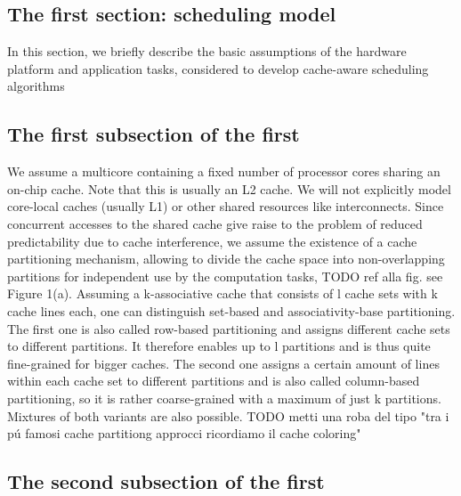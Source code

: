 \documentclass[a4paper,10pt]{article}
\begin{document}
\begin{multicols}{2}
\section{The first section: scheduling model}

In this section, we briefly describe the basic assumptions of the hardware platform and application tasks, considered to develop cache-aware 
scheduling algorithms

\subsection{The first subsection of the first}

We assume a multicore containing a fixed number of processor cores sharing an on-chip cache. Note that this is usually an L2 cache. We 
will not explicitly model core-local caches (usually L1) or other shared resources like interconnects. Since concurrent accesses to the shared 
cache give raise to the problem of reduced predictability due to cache interference, we assume the existence of a cache partitioning 
mechanism, allowing to divide the cache space into non-overlapping partitions for independent use by the computation tasks, TODO ref alla fig.
see Figure 1(a).
Assuming a k-associative cache that consists of l cache sets with k cache lines each, one can distinguish set-based and associativity-base
partitioning. The first one is also called row-based partitioning and assigns different cache sets to different partitions. It therefore enables
up to l partitions and is thus quite fine-grained for bigger caches. The second one assigns a certain amount of lines within each cache set 
to different partitions and is also called column-based partitioning, so it is rather coarse-grained with a maximum of just k partitions. 
Mixtures of both variants are also possible. TODO metti una roba del tipo "tra i p\'u famosi cache partitiong approcci ricordiamo il cache coloring"

\subsection{The second subsection of the first}


\end{multicols}
\end{document}
